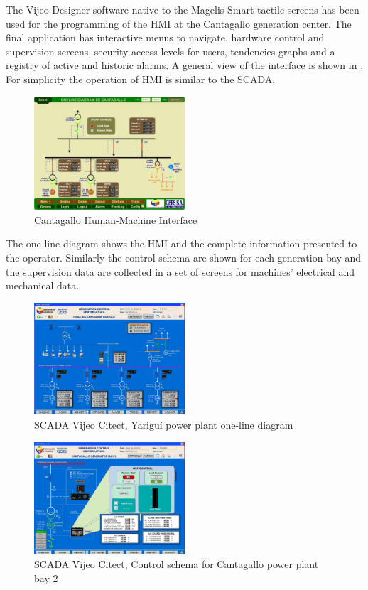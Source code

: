 The Vijeo Designer software native to the Magelis Smart tactile
screens has been used for the programming of the HMI at the
Cantagallo generation center. The final application has interactive
menus to navigate, hardware control and supervision screens, security
access levels for users, tendencies graphs and a registry of active
and historic alarms. A  general view of the interface is shown in
. For simplicity the operation of HMI is similar to the SCADA.

\begin{figure}
  \centering
  \includegraphics[width=0.5\textwidth]{img/hmi.png}
  \caption{Cantagallo Human-Machine Interface}
  \label{fig:hmi}
\end{figure}

The one-line diagram shows the HMI and the complete information
presented to the operator. Similarly the control schema are shown for
each generation bay and the supervision data are collected in a set of
screens for machines' electrical and mechanical data.

\begin{figure}
  \centering
  \includegraphics[width=0.5\textwidth]{img/oneline_scada.png}
  \caption{SCADA Vijeo Citect, Yariguí power plant one-line diagram}
  \label{fig:onelinescada}
\end{figure}

\begin{figure}
  \centering
  \includegraphics[width=0.5\textwidth]{img/bay_scada.png}
  \caption{SCADA Vijeo Citect, Control schema for Cantagallo power plant bay 2}
  \label{fig:bayscada}
\end{figure}

